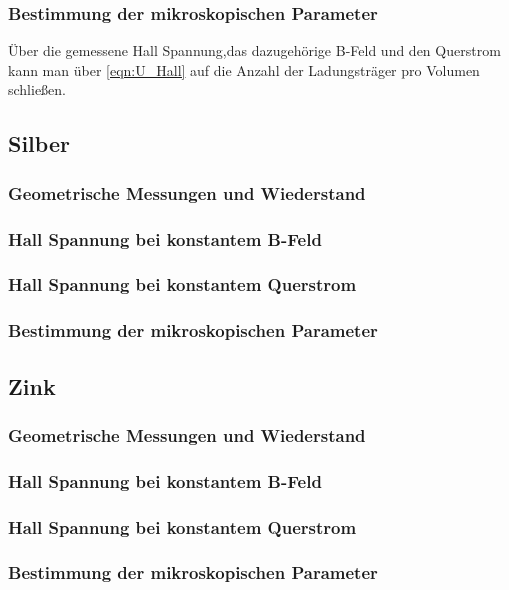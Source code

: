 \subsubsection{Bestimmung der mikroskopischen Parameter}
Über die gemessene Hall Spannung,das dazugehörige B-Feld und den Querstrom kann man über \ref{eqn:U_Hall} auf die Anzahl der Ladungsträger pro Volumen schließen.
\begin{equation*}
    
\end{equation*}
\subsection{Silber}
\subsubsection{Geometrische Messungen und Wiederstand}
\subsubsection{Hall Spannung bei konstantem B-Feld}
\subsubsection{Hall Spannung bei konstantem Querstrom}
\subsubsection{Bestimmung der mikroskopischen Parameter}
\subsection{Zink}
\subsubsection{Geometrische Messungen und Wiederstand}
\subsubsection{Hall Spannung bei konstantem B-Feld}
\subsubsection{Hall Spannung bei konstantem Querstrom}
\subsubsection{Bestimmung der mikroskopischen Parameter}
\label{sec:Auswertung}
